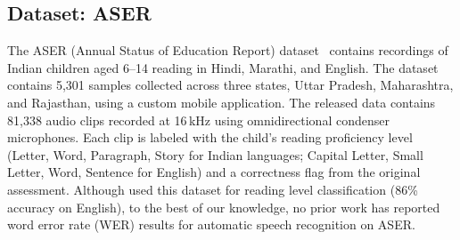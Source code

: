 \documentclass{article} %
\begin{document}
%
%
%
\subsection{Dataset: ASER}
\label{sec:dataset}

The ASER (Annual Status of Education Report) dataset~\citep{agarwal2019aser} contains recordings of Indian children aged 6--14 reading in Hindi, Marathi, and English. The dataset contains 5,301 samples collected across three states, Uttar Pradesh, Maharashtra, and Rajasthan, using a custom mobile application. The released data contains 81,338 audio clips recorded at 16\,kHz using omnidirectional condenser microphones. Each clip is labeled with the child's reading proficiency level (Letter, Word, Paragraph, Story for Indian languages; Capital Letter, Small Letter, Word, Sentence for English) and a correctness flag from the original assessment. Although \citet{agarwal2019aser} used this dataset for reading level classification (86\% accuracy on English), to the best of our knowledge, no prior work has reported word error rate (WER) results for automatic speech recognition on ASER.
\end{document}
